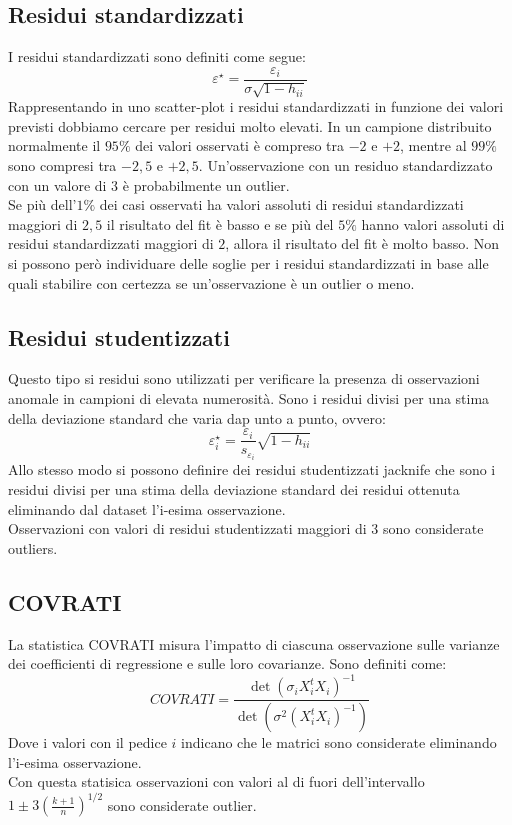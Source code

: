 \subsection{Residui standardizzati}
I residui standardizzati sono definiti come segue:
\begin{equation}
\varepsilon^\star = \frac{\varepsilon_i}{\sigma \sqrt{1-h_{ii}}}
\end{equation}
Rappresentando in uno scatter-plot i residui standardizzati in funzione dei valori previsti dobbiamo cercare per residui molto elevati. In un campione distribuito normalmente il $95\%$ dei valori osservati è compreso tra $-2$ e $+2$, mentre al $99\%$ sono compresi tra $-2,5$ e $+2,5$. Un'osservazione con un residuo standardizzato con un valore di $3$ è probabilmente un outlier.\\
Se più dell’$1\%$ dei casi osservati ha valori assoluti di residui standardizzati maggiori di $2,5$ il risultato del fit è basso e se più del $5\%$ hanno valori assoluti di residui standardizzati maggiori di $2$, allora il risultato del fit è molto basso. Non si possono però individuare delle soglie per i residui standardizzati in base alle quali stabilire con certezza se un'osservazione è un outlier o meno.

\subsection{Residui studentizzati}
Questo tipo si residui sono utilizzati per verificare la presenza di osservazioni anomale in campioni di elevata numerosità. Sono i residui divisi per una stima della deviazione standard che varia dap unto a punto, ovvero:
\begin{equation}
\varepsilon_i^\star = \frac{\varepsilon_i}{s_{\varepsilon_i}} \sqrt{1-h_{ii}}
\end{equation}
Allo stesso modo si possono definire dei residui studentizzati jacknife che sono i residui divisi per una stima della deviazione standard dei residui ottenuta eliminando dal dataset l'i-esima osservazione.\\
Osservazioni con valori di residui studentizzati maggiori di 3 sono considerate outliers.

\subsection{COVRATI}
La statistica COVRATI misura l'impatto di ciascuna osservazione sulle varianze dei coefficienti di regressione e sulle loro covarianze. Sono definiti come:
\begin{equation}
COVRATI = \frac{\det(\sigma_i X_i^t X_i)^{-1}}{\det(\sigma^2(X_i^t X_i)^{-1})}
\end{equation}
Dove i valori con il pedice $i$ indicano che le matrici sono considerate eliminando l'i-esima osservazione.\\
Con questa statisica osservazioni con valori al di fuori dell'intervallo $1 \pm 3(\frac{k+1}{n})^{1/2}$ sono considerate outlier.

